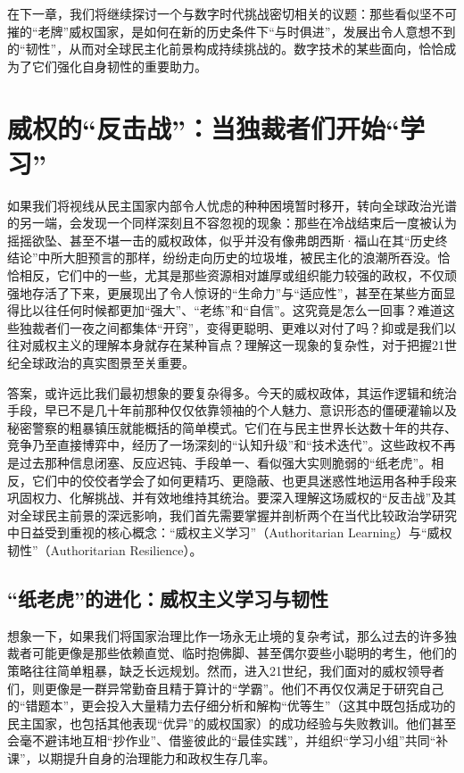 \documentclass[UTF8, 10pt]{ctexbook}
\begin{document}
在下一章，我们将继续探讨一个与数字时代挑战密切相关的议题：那些看似坚不可摧的“老牌”威权国家，是如何在新的历史条件下“与时俱进”，发展出令人意想不到的“韧性”，从而对全球民主化前景构成持续挑战的。数字技术的某些面向，恰恰成为了它们强化自身韧性的重要助力。

\chapter{威权的“反击战”：当独裁者们开始“学习”}

\lettrine[lines=3]{如}{果}我们将视线从民主国家内部令人忧虑的种种困境暂时移开，转向全球政治光谱的另一端，会发现一个同样深刻且不容忽视的现象：那些在冷战结束后一度被认为摇摇欲坠、甚至不堪一击的威权政体，似乎并没有像弗朗西斯·福山在其“历史终结论”中所大胆预言的那样，纷纷走向历史的垃圾堆，被民主化的浪潮所吞没。恰恰相反，它们中的一些，尤其是那些资源相对雄厚或组织能力较强的政权，不仅顽强地存活了下来，更展现出了令人惊讶的“生命力”与“适应性”，甚至在某些方面显得比以往任何时候都更加“强大”、“老练”和“自信”。这究竟是怎么一回事？难道这些独裁者们一夜之间都集体“开窍”，变得更聪明、更难以对付了吗？抑或是我们以往对威权主义的理解本身就存在某种盲点？理解这一现象的复杂性，对于把握21世纪全球政治的真实图景至关重要。

答案，或许远比我们最初想象的要复杂得多。今天的威权政体，其运作逻辑和统治手段，早已不是几十年前那种仅仅依靠领袖的个人魅力、意识形态的僵硬灌输以及秘密警察的粗暴镇压就能概括的简单模式。它们在与民主世界长达数十年的共存、竞争乃至直接博弈中，经历了一场深刻的“认知升级”和“技术迭代”。这些政权不再是过去那种信息闭塞、反应迟钝、手段单一、看似强大实则脆弱的“纸老虎”。相反，它们中的佼佼者学会了如何更精巧、更隐蔽、也更具迷惑性地运用各种手段来巩固权力、化解挑战、并有效地维持其统治。要深入理解这场威权的“反击战”及其对全球民主前景的深远影响，我们首先需要掌握并剖析两个在当代比较政治学研究中日益受到重视的核心概念：“威权主义学习”（Authoritarian Learning）与“威权韧性”（Authoritarian Resilience）。

\section{“纸老虎”的进化：威权主义学习与韧性}
\lettrine[lines=2]{想}{象}一下，如果我们将国家治理比作一场永无止境的复杂考试，那么过去的许多独裁者可能更像是那些依赖直觉、临时抱佛脚、甚至偶尔耍些小聪明的考生，他们的策略往往简单粗暴，缺乏长远规划。然而，进入21世纪，我们面对的威权领导者们，则更像是一群异常勤奋且精于算计的“学霸”。他们不再仅仅满足于研究自己的“错题本”，更会投入大量精力去仔细分析和解构“优等生”（这其中既包括成功的民主国家，也包括其他表现“优异”的威权国家）的成功经验与失败教训。他们甚至会毫不避讳地互相“抄作业”、借鉴彼此的“最佳实践”，并组织“学习小组”共同“补课”，以期提升自身的治理能力和政权生存几率。
\end{document}
